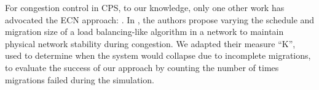 For congestion control in \ac{CPS}, to our knowledge, only one other work has advocated the \ac{ECN} approach: \cite{ecn-cloudhari}.
In \cite{ecn-cloudhari}, the authors propose varying the schedule and migration size of a load balancing-like algorithm in a network to maintain physical network stability during congestion.
We adapted their measure ``K'', used to determine when the system would collapse due to incomplete migrations, to evaluate the success of our approach by counting the number of times migrations failed during the simulation.

